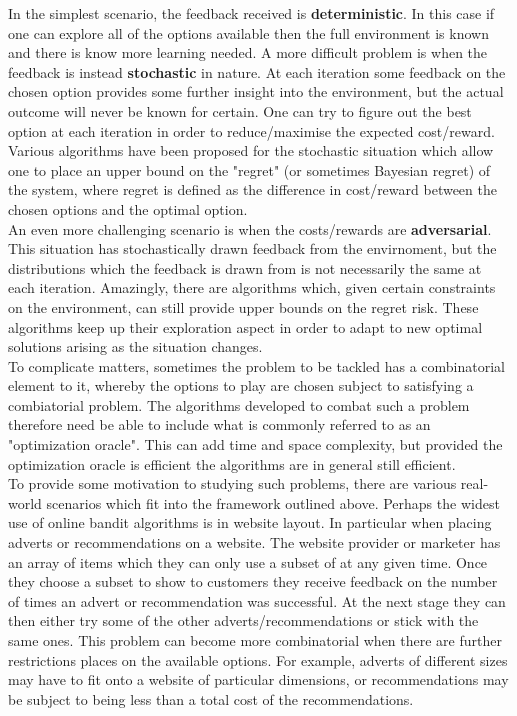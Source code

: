 In the simplest scenario, the feedback received is \textbf{deterministic}. In this case if one can explore all of the options available then the full environment is known and there is know more learning needed. A more difficult problem is when the feedback is instead \textbf{stochastic} in nature. At each iteration some feedback on the chosen option provides some further insight into the environment, but the actual outcome will never be known for certain. One can try to figure out the best option at each iteration in order to reduce/maximise the expected cost/reward. Various algorithms have been proposed for the stochastic situation which allow one to place an upper bound on the "regret" (or sometimes Bayesian regret) of the system, where regret is defined as the difference in cost/reward between the chosen options and the optimal option.\\

An even more challenging scenario is when the costs/rewards are \textbf{adversarial}. This situation has stochastically drawn feedback from the envirnoment, but the distributions which the feedback is drawn from is not necessarily the same at each iteration. Amazingly, there are algorithms which, given certain constraints on the environment, can still provide upper bounds on the regret risk. These algorithms keep up their exploration aspect in order to adapt to new optimal solutions arising as the situation changes.\\

To complicate matters, sometimes the problem to be tackled has a combinatorial element to it, whereby the options to play are chosen subject to satisfying a combiatorial problem. The algorithms developed to combat such a problem therefore need be able to include what is commonly referred to as an "optimization oracle". This can add time and space complexity, but provided the optimization oracle is efficient the algorithms are in general still efficient.\\

To provide some motivation to studying such problems, there are various real-world scenarios which fit into the framework outlined above. Perhaps the widest use of online bandit algorithms is in website layout. In particular when placing adverts or recommendations on a website. The website provider or marketer has an array of items which they can only use a subset of at any given time. Once they choose a subset to show to customers they receive feedback on the number of times an advert or recommendation was successful. At the next stage they can then either try some of the other adverts/recommendations or stick with the same ones. This problem can become more combinatorial when there are further restrictions places on the available options. For example, adverts of different sizes may have to fit onto a website of particular dimensions, or recommendations may be subject to being less than a total cost of the recommendations.\\

